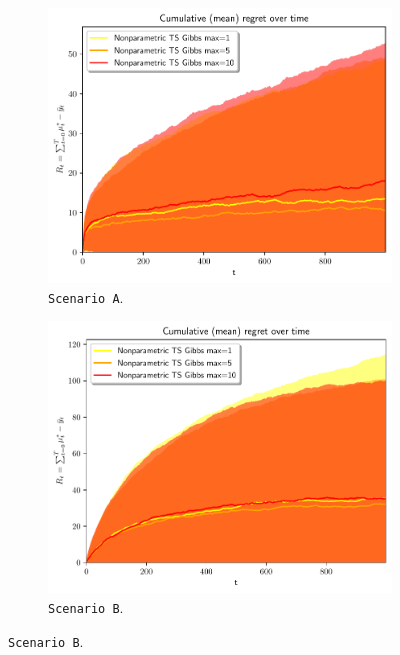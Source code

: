\begin{figure}[!h]
	\centering
	\begin{subfigure}[c]{0.45\textwidth}
		\includegraphics[width=\textwidth]{./figs/linear_gaussian_mixture_easy_gibbsmaxiter/cum_optexpected_regret_top_five_std}
		\vspace*{-5ex}
		\caption{\texttt{Scenario A}.}
		\label{fig:scenario_A_gibbsmaxiter_std}
	\end{subfigure}
	\begin{subfigure}[c]{0.45\textwidth}
		\includegraphics[width=\textwidth]{./figs/linear_gaussian_mixture_hard_gibbsmaxiter/cum_optexpected_regret_top_five_std}
		\vspace*{-5ex}
		\caption{\texttt{Scenario B}.}
		\label{fig:scenario_B_gibbsmaxiter_std}
	\end{subfigure}
	

\end{figure}
